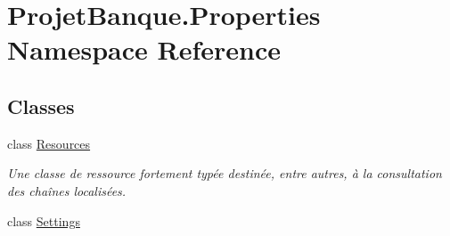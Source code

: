 \hypertarget{namespace_projet_banque_1_1_properties}{}\section{Projet\+Banque.\+Properties Namespace Reference}
\label{namespace_projet_banque_1_1_properties}
\subsection*{Classes}
\begin{DoxyCompactItemize}
\item 
class \mbox{\hyperlink{class_projet_banque_1_1_properties_1_1_resources}{Resources}}
\begin{DoxyCompactList}\small\item\em Une classe de ressource fortement typée destinée, entre autres, à la consultation des chaînes localisées. \end{DoxyCompactList}\item 
class \mbox{\hyperlink{class_projet_banque_1_1_properties_1_1_settings}{Settings}}
\end{DoxyCompactItemize}
